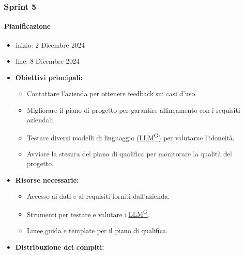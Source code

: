 \documentclass{article}
\begin{document}
            \subsubsection{Sprint 5}
                \paragraph{Pianificazione}
                \begin{itemize}
                    \item inizio: 2 Dicembre 2024
                    \item fine: 8 Dicembre 2024
                \end{itemize}
                \begin{itemize}
                    \item \textbf{Obiettivi principali:}
                    \begin{itemize}
                        \item Contattare l'azienda per ottenere feedback sui casi d'uso.
                        \item Migliorare il piano di progetto per garantire allineamento con i requisiti aziendali.
                        \item Testare diversi modelli di linguaggio (\href{https://code7crusaders.github.io/docs/PB/documentazione_interna/glossario.html#llm-large-language-model}{LLM\textsuperscript{G}}) per valutarne l'idoneità.
                        \item Avviare la stesura del piano di qualifica per monitorare la qualità del progetto.
                    \end{itemize}
                    \item \textbf{Risorse necessarie:}
                    \begin{itemize}
                        \item Accesso ai dati e ai requisiti forniti dall'azienda.
                        \item Strumenti per testare e valutare i \href{https://code7crusaders.github.io/docs/PB/documentazione_interna/glossario.html#llm-large-language-model}{LLM\textsuperscript{G}}.
                        \item Linee guida e template per il piano di qualifica.
                    \end{itemize}
                    \item \textbf{Distribuzione dei compiti:}
                    \begin{itemize}

\end{itemize}
\end{itemize}
\end{document}
